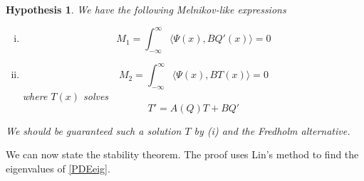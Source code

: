 \documentclass[12pt]{article}
\newtheorem{hypothesis}{Hypothesis}
\begin{document}
\begin{hypothesis}\label{Melnikov2}
We have the following Melnikov-like expressions
\begin{enumerate}[(i)]
\item 
\begin{equation}
M_1 = \int_{-\infty}^\infty \langle \Psi(x), B Q'(x) \rangle = 0
\end{equation}
\item 
\begin{equation}
M_2 = \int_{-\infty}^\infty \langle \Psi(x), B T(x) \rangle = 0
\end{equation}
where $T(x)$ solves 
\begin{equation}
T' = A(Q)T + BQ'
\end{equation}
\end{enumerate}
We should be guaranteed such a solution $T$ by (i) and the Fredholm alternative.
\end{hypothesis}

We can now state the stability theorem. The proof uses Lin's method to find the eigenvalues of \eqref{PDEeig}.

\end{document}
